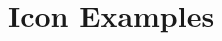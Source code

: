 \documentclass{article}
\begin{document}
\section{Icon Examples}

\setlength\LTleft{0pt}
\setlength\LTright{0pt}

\end{document}
